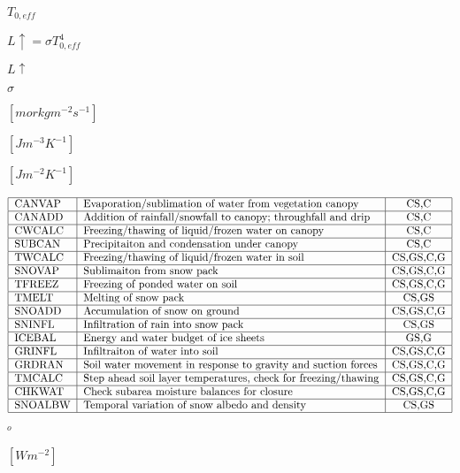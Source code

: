 \documentclass{article}
\begin{document}
$T_{0,eff}$
\pagebreak

$L\uparrow = \sigma T_{0,eff}^4$
\pagebreak

$L\uparrow$
\pagebreak

$\sigma$
\pagebreak

$[m or kg m^{-2} s^{-1}]$
\pagebreak

$[J m^{-3} K^{-1}]$
\pagebreak

$[J m^{-2} K^{-1}] $
\pagebreak

\[ \begin{tabular} { | l | l | c | } \hline CANVAP & Evaporation/sublimation of water from vegetation canopy & CS,C \\ \hline CANADD & Addition of rainfall/snowfall to canopy; throughfall and drip & CS,C \\ \hline CWCALC & Freezing/thawing of liquid/frozen water on canopy & CS,C \\ \hline SUBCAN & Precipitaiton and condensation under canopy & CS,C \\ \hline TWCALC & Freezing/thawing of liquid/frozen water in soil & CS,GS,C,G \\ \hline SNOVAP & Sublimaiton from snow pack & CS,GS,C,G \\ \hline TFREEZ & Freezing of ponded water on soil & CS,GS,C,G \\ \hline TMELT & Melting of snow pack & CS,GS \\ \hline SNOADD & Accumulation of snow on ground & CS,GS,C,G \\ \hline SNINFL & Infiltration of rain into snow pack & CS,GS \\ \hline ICEBAL & Energy and water budget of ice sheets & GS,G \\ \hline GRINFL & Infiltraiton of water into soil & CS,GS,C,G \\ \hline GRDRAN & Soil water movement in response to gravity and suction forces & CS,GS,C,G \\ \hline TMCALC & Step ahead soil layer temperatures, check for freezing/thawing & CS,GS,C,G \\ \hline CHKWAT & Check subarea moisture balances for closure & CS,GS,C,G \\ \hline SNOALBW & Temporal variation of snow albedo and density & CS,GS \\ \hline \end{tabular} \]
\pagebreak

$^o$
\pagebreak

$[W m^{-2}] $
\pagebreak
\end{document}

